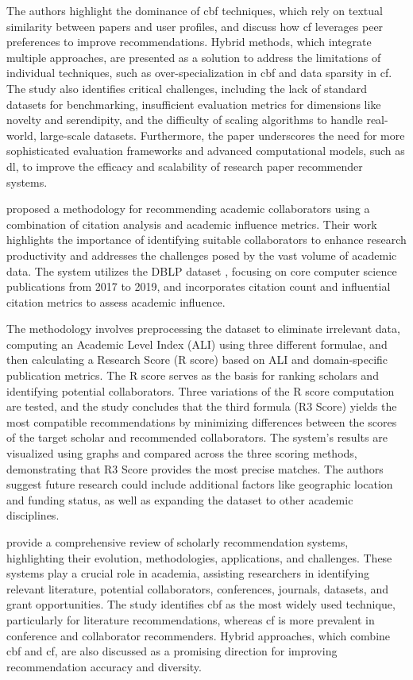 The authors highlight the dominance of \gls{cbf} techniques, which rely on textual similarity between papers and user profiles, and discuss how \gls{cf} leverages peer preferences to improve recommendations.
Hybrid methods, which integrate multiple approaches, are presented as a solution to address the limitations of individual techniques, such as over-specialization in \gls{cbf} and data sparsity in \gls{cf}.
The study also identifies critical challenges, including the lack of standard datasets for benchmarking, insufficient evaluation metrics for dimensions like novelty and serendipity, and the difficulty of scaling algorithms to handle real-world, large-scale datasets.
Furthermore, the paper underscores the need for more sophisticated evaluation frameworks and advanced computational models, such as \gls{dl}, to improve the efficacy and scalability of research paper recommender systems.

\textcite{Jagadishwari2023} proposed a methodology for recommending academic collaborators using a combination of citation analysis and academic influence metrics.
Their work highlights the importance of identifying suitable collaborators to enhance research productivity and addresses the challenges posed by the vast volume of academic data.
The system utilizes the DBLP dataset \cite{Ley2002}, focusing on core computer science publications from 2017 to 2019, and incorporates citation count and influential citation metrics to assess academic influence.

The methodology involves preprocessing the dataset to eliminate irrelevant data, computing an Academic Level Index (ALI) using three different formulae, and then calculating a Research Score (R score) based on ALI and domain-specific publication metrics.
The R score serves as the basis for ranking scholars and identifying potential collaborators.
Three variations of the R score computation are tested, and the study concludes that the third formula (R3 Score) yields the most compatible recommendations by minimizing differences between the scores of the target scholar and recommended collaborators.
The system's results are visualized using graphs and compared across the three scoring methods, demonstrating that R3 Score provides the most precise matches.
The authors suggest future research could include additional factors like geographic location and funding status, as well as expanding the dataset to other academic disciplines.

\textcite{Zhang2023} provide a comprehensive review of scholarly recommendation systems, highlighting their evolution, methodologies, applications, and challenges.
These systems play a crucial role in academia, assisting researchers in identifying relevant literature, potential collaborators, conferences, journals, datasets, and grant opportunities.
The study identifies \gls{cbf} as the most widely used technique, particularly for literature recommendations, whereas \gls{cf} is more prevalent in conference and collaborator recommenders.
Hybrid approaches, which combine \gls{cbf} and \gls{cf}, are also discussed as a promising direction for improving recommendation accuracy and diversity.

